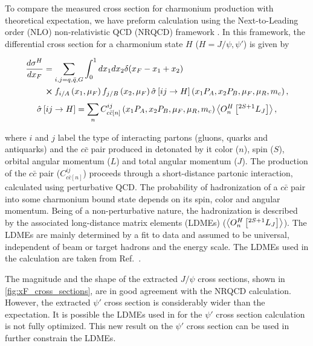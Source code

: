 \documentclass[reprint,aps,unsortedaddress,superscriptaddress,prd,floatfix,showpacs,linenumbers]{revtex4-2}
\begin{document}
To compare the measured cross section for charmonium
production with theoretical expectation, we have preform calculation
using the Next-to-Leading order (NLO) non-relativistic QCD (NRQCD)
framework \cite{bodwin1995}. In this framework, the differential cross section
for a charmonium state $H$ ($H=J/\psi, \psi'$) is given by
\begin{widetext}
	\begin{equation}
		\begin{split}
			\frac{d\sigma^H}{dx_F} &=\sum_{i,j = q,\bar{q},G}\int^1_0 dx_1 dx_2 \delta(x_F-x_1+x_2)\\
			&\cross f_{i/A}\left(x_1,\mu_F\right)f_{j/B}\left(x_2,\mu_F\right)\hat{\sigma}\left[ij\to H\right]\left(x_1P_A,x_2P_B,\mu_F,\mu_R , m_c\right),
		\end{split}
	\end{equation}
	\begin{equation}
		\hat{\sigma}\left[ij\to H\right]= \sum_n C^{ij}_{c\bar{c}\left[n\right]}\left(x_1P_A,x_2P_B,\mu_F,\mu_R , m_c\right)\expval{O^H_n \left[^{2S+1}L_J\right]},
	\end{equation}
\end{widetext}
where $i$ and $j$ label the type of interacting partons (gluons, quarks and antiquarks)
and the $c\bar{c}$ pair produced in detonated by it color ($n$), spin ($S$),
orbital angular momentum ($L$) and total angular momentum ($J$).
The production of the $c\bar{c}$ pair ($C^{ij}_{c\bar{c}\left[n\right]}$) proceeds
through a short-distance partonic interaction, calculated using perturbative QCD.
The probability of hadronization of a $c\bar{c}$ pair into some charmonium bound
state depends on its spin, color and angular momentum.
Being of a non-perturbative nature, the hadronization is described by the associated
long-distance matrix elements (LDMEs) ($\expval{O^H_n \left[^{2S+1}L_J\right]}$).
The LDMEs are mainly determined by a fit to data and assumed to be universal, independent of beam or target hadrons and the energy scale. The LDMEs used in the calculation are taken from Ref.~\cite{hsieh2021}.

The magnitude and the shape of the extracted $J/\psi$ cross sections,
shown in \cref{fig:xF_cross_sections}, are in good agreement with the NRQCD calculation.
However, the extracted $\psi'$ cross section is considerably wider than the expectation.
It is possible the LDMEs used in for the $\psi'$ cross section calculation is not fully optimized.
This new result on the $\psi'$ cross section can be used in further constrain the LDMEs.
\end{document}
